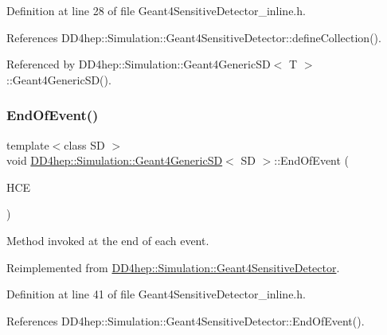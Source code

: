Definition at line 28 of file Geant4\+Sensitive\+Detector\+\_\+inline.\+h.



References D\+D4hep\+::\+Simulation\+::\+Geant4\+Sensitive\+Detector\+::define\+Collection().



Referenced by D\+D4hep\+::\+Simulation\+::\+Geant4\+Generic\+S\+D$<$ T $>$\+::\+Geant4\+Generic\+S\+D().

\hypertarget{class_d_d4hep_1_1_simulation_1_1_geant4_generic_s_d_a07009f3334d1f7125c128cc59fc20e6e}{}\label{class_d_d4hep_1_1_simulation_1_1_geant4_generic_s_d_a07009f3334d1f7125c128cc59fc20e6e} 
\subsubsection{\texorpdfstring{End\+Of\+Event()}{EndOfEvent()}}
{\footnotesize\ttfamily template$<$class SD $>$ \\
void \hyperlink{class_d_d4hep_1_1_simulation_1_1_geant4_generic_s_d}{D\+D4hep\+::\+Simulation\+::\+Geant4\+Generic\+SD}$<$ SD $>$\+::End\+Of\+Event (\begin{DoxyParamCaption}\item[{G4\+H\+Cof\+This\+Event $\ast$}]{H\+CE }\end{DoxyParamCaption})\hspace{0.3cm}{\ttfamily [virtual]}}



Method invoked at the end of each event. 



Reimplemented from \hyperlink{class_d_d4hep_1_1_simulation_1_1_geant4_sensitive_detector_a1275a33abdbd4efb70ee1698eda3d2db}{D\+D4hep\+::\+Simulation\+::\+Geant4\+Sensitive\+Detector}.



Definition at line 41 of file Geant4\+Sensitive\+Detector\+\_\+inline.\+h.



References D\+D4hep\+::\+Simulation\+::\+Geant4\+Sensitive\+Detector\+::\+End\+Of\+Event().

\hypertarget{class_d_d4hep_1_1_simulation_1_1_geant4_generic_s_d_a1e65440bc948eb7ba84792fcfdd002ed}{}\label{class_d_d4hep_1_1_simulation_1_1_geant4_generic_s_d_a1e65440bc948eb7ba84792fcfdd002ed} 
